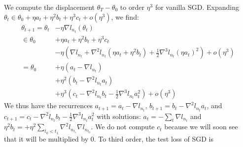 \documentclass[openany, notitlepage, justified]{tufte-book}
\theoremstyle{plain}
\theoremstyle{definition}
\newcommand{\wrap}[1]{\left(#1\right)}
\begin{document}
            \begin{shaded}
                We compute the displacement $\theta_T-\theta_0$ to order $\eta^3$ 
                for vanilla SGD.  Expanding
                $
                    \theta_t \in \theta_0 + \eta a_t + \eta^2 b_t + \eta^3 c_t 
                    + o(\eta^3)
                $, we find:
                \begin{align*}
                    \theta_{t+1}
                    =
                    \theta_t    &-  \eta \nabla l_{n_t} (\theta_t) \\
                    \in\theta_0 &+  \eta a_t + \eta^2 b_t + \eta^3 c_t \\
                                &-  \eta \wrap{
                                         \nabla l_{n_t}
                                        +\nabla^2 l_{n_t} (\eta a_t + \eta^2 b_t)
                                        +\frac{1}{2} \nabla^3 l_{n_t} (\eta a_t)^2
                                    }
                                 +  o(\eta^3) \\
                    =
                    \theta_0    &+   \eta   \wrap{a_t - \nabla l_{n_t}} \\
                                &+   \eta^2 \wrap{b_t - \nabla^2 l_{n_t} a_t} \\ 
                                &+   \eta^3 \wrap{
                                         c_t
                                        -\nabla^2 l_{n_t} b_t
                                        -\frac{1}{2} \nabla^3 l_{n_t} a_t^2
                                     }
                                 +   o(\eta^3)
                \end{align*}
                We thus have the recurrences
                $
                    a_{t+1} = a_t - \nabla l_{n_t}
                $,
                $
                    b_{t+1} = b_t - \nabla^2 l_{n_t} a_t
                $, and
                $
                    c_{t+1} = c_t -\nabla^2 l_{n_t} b_t 
                                  -\frac{1}{2} \nabla^3 l_{n_t} a_t^2
                $
                with solutions:
                $a_t = -\sum_{t} \nabla l_{n_t}$ and
                $\eta^2 b_t = +\eta^2 \sum_{t_0 < t_1} \nabla^2 l_{n_{t_1}} \nabla l_{n_{t_0}}$.
                We do not compute $c_t$ because we will soon see that it will be
                multiplied by $0$.
                To third order, the test loss of SGD is
                \begin{align*}

\end{align*}
\end{shaded}
\end{document}
